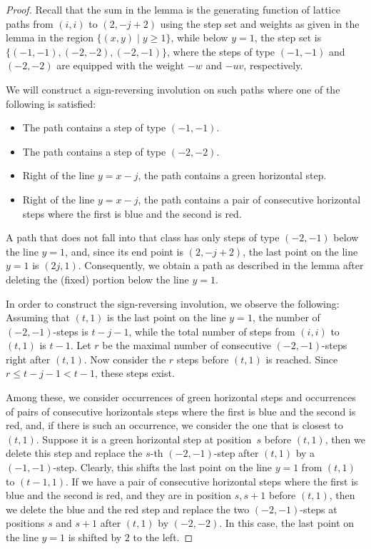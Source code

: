 \documentclass[12pt]{amsart}
\theoremstyle{definition}
\numberwithin{equation}{section}
\begin{document}
\begin{proof}
	Recall that the sum in the lemma is the generating function of lattice paths from $(i,i)$ to 
	$(2,-j+2)$ using the step set and weights as given in the lemma in the region 
	$\{(x,y) \mid y \ge 1\}$, while below $y=1$, the step set is $\{(-1,-1),(-2,-2),(-2,-1)\}$, where the steps of type $(-1,-1)$  and $(-2,-2)$ are equipped with the weight $-w$ and $-u v$, respectively. 
	
	We will construct a sign-reversing involution on such paths where one of the following is satisfied:
	\begin{itemize}
		\item The path contains a step of type $(-1,-1)$.
		\item The path contains a step of type $(-2,-2)$.
		\item Right of the line $y=x-j$, the path contains a green horizontal step.
		\item Right of the line $y=x-j$, the path contains a pair of consecutive horizontal steps where the first is blue and the second is red.
	\end{itemize} 
	A path that does not fall into that class has only steps of type $(-2,-1)$ below the line $y=1$, and, since its end point is $(2,-j+2)$, the last point on the line $y=1$ is $(2j,1)$. Consequently, we obtain a path as described in the lemma after deleting the (fixed) portion below the line $y=1$.  
	
	In order to construct the sign-reversing involution, we observe the following: Assuming that $(t,1)$ is the last point on the line $y=1$, the number of $(-2,-1)$-steps is $t-j-1$, while the total number of 
	steps from $(i,i)$ to $(t,1)$ is $t-1$. Let $r$ be the maximal number of consecutive $(-2,-1)$-steps right after 
	$(t,1)$. Now consider the $r$ steps before $(t,1)$ is reached. Since $r \le t-j-1 < t-1$, these steps exist.
	
	Among these, we consider occurrences of green horizontal steps and occurrences of pairs of consecutive horizontals steps  where the first is blue and the second is red, and, if there is such an occurrence, we consider the one that is closest to $(t,1)$.  Suppose it is a green horizontal step at position~$s$ before 
	$(t,1)$, then we delete this step and replace the $s$-th $(-2,-1)$-step after $(t,1)$ by a $(-1,-1)$-step. Clearly, this shifts the last point on the line $y=1$ from $(t,1)$ to $(t-1,1)$. If we have a pair of consecutive horizontal steps where the first is blue and the second is red, and they are in position $s,s+1$ before $(t,1)$, then we delete the blue and the red step and replace the two $(-2,-1)$-steps at positions $s$ and $s+1$ after $(t,1)$ by $(-2,-2)$. In this case, the last point on the line $y=1$ is shifted by $2$ to the left.
	

\end{proof}
\end{document}
